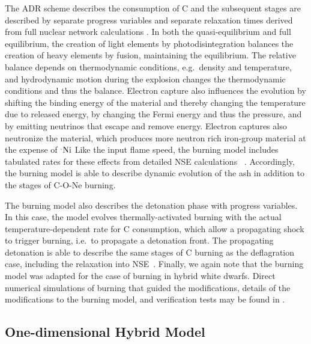 \documentclass[iop,apj]{emulateapj}
\newcommand{\Ni}[1]{\ensuremath{{}^{#1}{\rm Ni}}}
\begin{document}
The ADR scheme describes the consumption of C and the subsequent stages
are described by separate progress variables and
separate relaxation times derived from full nuclear network calculations
\cite{Caldetal07,townetal2016}. In both the quasi-equilibrium and full equilibrium, 
the creation of light elements by photodisintegration balances the creation of heavy 
elements by fusion, maintaining the equilibrium. The relative balance depends on
thermodynamic conditions, e.g.\ density and temperature, and hydrodynamic motion
during the explosion changes the thermodynamic conditions and thus the
balance. Electron capture also influences the evolution by shifting the binding 
energy of the material and thereby changing the temperature due to released energy, 
by changing the Fermi energy and thus the pressure, and by emitting neutrinos that 
escape and remove energy. Electron captures also neutronize the material, which 
produces more neutron rich iron-group material at the expense of \Ni. Like the 
input flame speed, the burning model includes tabulated rates for these effects 
from detailed NSE calculations ~\cite{SeitTownetal09}. Accordingly, the burning
model is able to describe dynamic evolution of the ash in addition to the 
stages of C-O-Ne burning.

The burning model also describes the detonation phase with progress variables.  
In this case, the model evolves thermally-activated burning with the actual
temperature-dependent rate for C consumption, which allow a propagating shock to
trigger burning, i.e.\ to propagate a detonation front. The propagating detonation 
is able to describe the same stages of C burning as the deflagration case, including 
the relaxation into NSE~\cite[and references therein]{townetal2016}. Finally,
we again note that the burning model was adapted for the case of burning in
hybrid white dwarfs. Direct numerical simulations of burning that guided 
the modifications, details of the modifications to the burning model, and
verification tests may be found in \citet{willcoxetal2016}.

\subsection{One-dimensional Hybrid Model}
\end{document}
